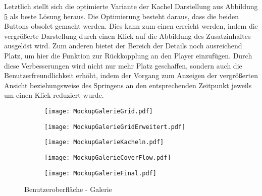 
Letztlich stellt sich die optimierte Variante der Kachel Darstellung aus Abbildung \ref{fig:MockupGalerieFinal} als beste Lösung heraus. Die Optimierung besteht daraus, dass die beiden Buttons obsolet gemacht werden. Dies kann zum einen erreicht werden, indem die vergrößerte Darstellung durch einen Klick auf die Abbildung des Zusatzinhaltes ausgelöst wird. Zum anderen bietet der Bereich der Details noch ausreichend Platz, um hier die Funktion zur Rückkopplung an den Player einzufügen. Durch diese Verbesserungen wird nicht nur mehr Platz geschaffen, sondern auch die Benutzerfreundlichkeit erhöht, indem der Vorgang zum Anzeigen der vergrößerten Ansicht beziehungsweise des Springens an den entsprechenden Zeitpunkt jeweils um einen Klick reduziert wurde.

\begin{figure}[h!]
\begin{subfigure}[c]{0.5\textwidth}
\texttt{[image: MockupGalerieGrid.pdf]}
\label{fig:MockupGalerieGrid}
\end{subfigure}%
\begin{subfigure}[c]{0.5\textwidth}
\texttt{[image: MockupGalerieGridErweitert.pdf]}
\label{fig:MockupGalerieGridErweitert}
\end{subfigure}
\par\bigskip
\begin{subfigure}[c]{0.5\textwidth}
\texttt{[image: MockupGalerieKacheln.pdf]}
\label{fig:MockupGalerieKacheln}
\end{subfigure}%
\begin{subfigure}[c]{0.5\textwidth}
\texttt{[image: MockupGalerieCoverFlow.pdf]}
\label{fig:MockupGalerieCoverFlow}
\end{subfigure}
\par\bigskip
\begin{subfigure}[c]{\textwidth}
\texttt{[image: MockupGalerieFinal.pdf]}
\label{fig:MockupGalerieFinal}
\end{subfigure}
\caption{Benutzeroberfläche - Galerie}
\label{fig:MockupGalerie}
\end{figure}


